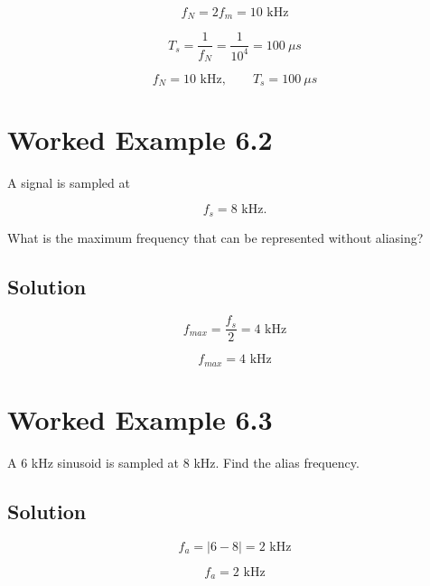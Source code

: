 \[
f_N=2f_m=10\text{ kHz}
\]

\[
T_s=\frac{1}{f_N}
=\frac{1}{10^4}
=100\ \mu s
\]

\[
\boxed{
f_N=10\text{ kHz},
\qquad
T_s=100\ \mu s
}
\]


\section{Worked Example 6.2}

A signal is sampled at

\[
f_s=8\text{ kHz}.
\]

What is the maximum frequency that can be represented without aliasing?


\subsection{Solution}

\[
f_{max}=\frac{f_s}{2}=4\text{ kHz}
\]

\[
\boxed{
f_{max}=4\text{ kHz}
}
\]


\section{Worked Example 6.3}

A 6 kHz sinusoid is sampled at 8 kHz. Find the alias frequency.


\subsection{Solution}

\[
f_a=|6-8|=2\text{ kHz}
\]

\[
\boxed{
f_a=2\text{ kHz}
}
\]


